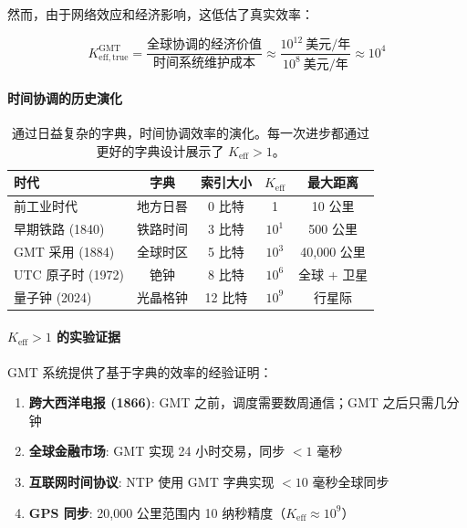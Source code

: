 \documentclass[11pt,a4paper]{article}
\begin{document}
	然而，由于网络效应和经济影响，这低估了真实效率：
	
	\begin{equation}
		K_{\mathrm{eff, true}}^{\mathrm{GMT}} = \frac{\text{全球协调的经济价值}}{\text{时间系统维护成本}} \approx \frac{10^{12}\ \text{美元/年}}{10^8\ \text{美元/年}} \approx 10^4
	\end{equation}
	
	\paragraph{时间协调的历史演化}
	\begin{table}[htbp]
		\centering
		\begin{tabular}{lcccc}
			\toprule
			\textbf{时代} & \textbf{字典} & \textbf{索引大小} & \textbf{$K_{\mathrm{eff}}$} & \textbf{最大距离} \\
			\midrule
			前工业时代 & 地方日晷 & 0 比特 & 1 & 10 公里 \\
			早期铁路 (1840) & 铁路时间 & 3 比特 & $10^1$ & 500 公里 \\
			GMT 采用 (1884) & 全球时区 & 5 比特 & $10^3$ & 40,000 公里 \\
			UTC 原子时 (1972) & 铯钟 & 8 比特 & $10^6$ & 全球 + 卫星 \\
			量子钟 (2024) & 光晶格钟 & 12 比特 & $10^9$ & 行星际 \\
			\bottomrule
		\end{tabular}
		\caption{通过日益复杂的字典，时间协调效率的演化。每一次进步都通过更好的字典设计展示了 $K_{\mathrm{eff}} > 1$。}
		\label{tab:time-keff-evolution}
	\end{table}
	
	\paragraph{$K_{\mathrm{eff}} > 1$ 的实验证据}
	GMT 系统提供了基于字典的效率的经验证明：
	
	\begin{enumerate}
		\item \textbf{跨大西洋电报 (1866)}: GMT 之前，调度需要数周通信；GMT 之后只需几分钟
		\item \textbf{全球金融市场}: GMT 实现 24 小时交易，同步 $<1$ 毫秒
		\item \textbf{互联网时间协议}: NTP 使用 GMT 字典实现 $<10$ 毫秒全球同步
		\item \textbf{GPS 同步}: 20,000 公里范围内 10 纳秒精度（$K_{\mathrm{eff}} \approx 10^9$）
	\end{enumerate}
	
\end{document}
